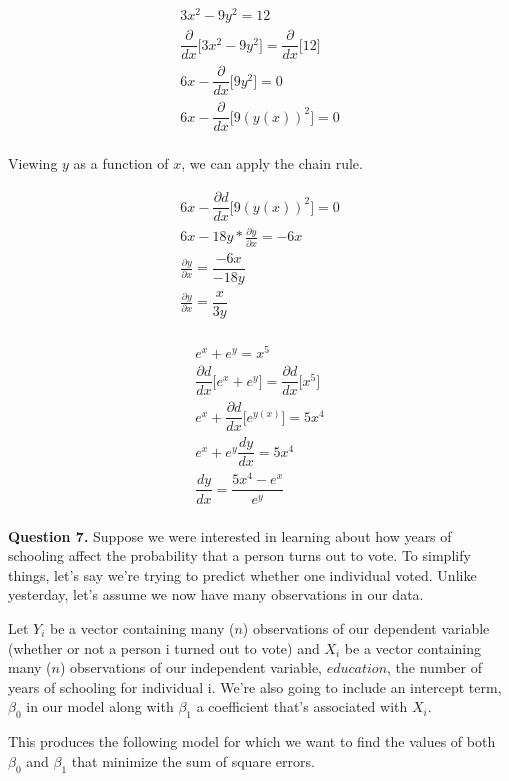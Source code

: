 \documentclass[10pt]{amsart}
\begin{document}
\begin{eqnarray*}
3x^2 - 9y^2 = 12\\
\dfrac{\partial }{dx}\bigg[ 3x^2 - 9y^2 \bigg] = \dfrac{\partial }{dx}\bigg[ 12\bigg]\\
 6x - \dfrac{\partial }{dx}\bigg[9y^2 \bigg] = 0\\
  6x - \dfrac{\partial }{dx}\bigg[9(y(x))^2 \bigg] = 0\\
\end{eqnarray*}

Viewing $y$ as a function of $x$, we can apply the chain rule. 

\begin{eqnarray*}
  6x - \dfrac{\partial d}{dx}\bigg[9(y(x))^2 \bigg] = 0\\
  6x  -18y*\frac{\partial y}{\partial x}  = -6x\\
\frac{\partial y}{\partial x}= \dfrac{-6x}{-18y}\\
\frac{\partial y}{\partial x}  = \dfrac{x}{3y}\\
\end{eqnarray*}

\begin{eqnarray*}
e^x +e^y = x^5\\
\dfrac{\partial d}{dx}\bigg[e^x +e^y\bigg] = \dfrac{\partial d}{dx}\bigg[x^5\bigg]\\
e^x + \dfrac{\partial d}{dx}\bigg[e^{y(x)}\bigg] = 5x^4\\
e^x + e^y \dfrac{dy}{dx}= 5x^4\\
\dfrac{dy}{dx} = \dfrac{5x^4-e^x}{e^y}\\
\end{eqnarray*}

\noindent \textbf{Question 7.} Suppose we were interested in learning about how years of schooling affect the probability that a person turns out to vote. To simplify things, let's say we're trying to predict whether one individual voted. Unlike yesterday, let's assume we now have many observations in our data. 

Let $Y_i$ be a vector containing many ($n$) observations of our dependent variable (whether or not a person i turned out to vote) and $X_i$ be a vector containing many ($n$) observations of our independent variable, $education$, the number of years of schooling for individual i. We're also going to include an intercept term, $\beta_0$ in our model along with $\beta_1$ a coefficient that's associated with $X_i$. 

This produces the following model for which we want to find the values of both $\beta_0$ and $\beta_1$ that minimize the sum of square errors. 
\end{document}
